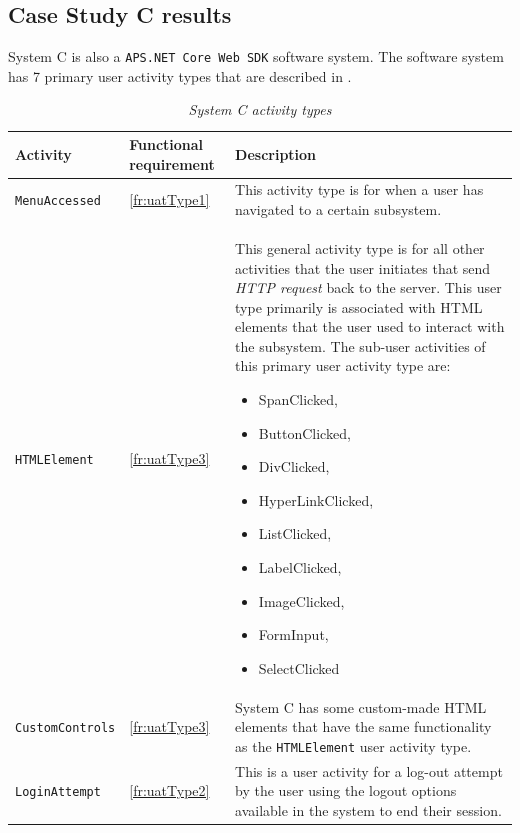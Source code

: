 \clearpage

\subsection{Case Study C results}\label{sec:ch3_csC}
System C is also a \texttt{APS.NET Core Web SDK} software system. The software system has 7 primary user activity types that are described in .

\begin{table}[!htb]
	\centering
	\caption[System A activity types]{\textit{System C activity types}}
	\label{tbl:ch3_systemCActivityTypes}
	\begin{tabularx}{\textwidth}{|l|l|X|}
		\hline \textbf{Activity} & \textbf{Functional requirement} & \textbf{Description} \\
		\hline \texttt{MenuAccessed} & \ref{fr:uatType1} & \RaggedRight This activity type is for when a user has navigated to a certain subsystem. \\ 
		\hline \texttt{HTMLElement} & \ref{fr:uatType3} & \RaggedRight This general activity type is for all other activities that the user initiates that send \textit{HTTP request} back to the server. This user type primarily is associated with HTML elements that the user used to interact with the subsystem. The sub-user activities of this primary user activity type are: \begin{itemize}
			\item SpanClicked,
			\item ButtonClicked, 
			\item DivClicked, 
			\item HyperLinkClicked,
			\item ListClicked, 
			\item LabelClicked, 
			\item ImageClicked, 
			\item FormInput, 
			\item SelectClicked
		\end{itemize} \\
		\hline \texttt{CustomControls} & \ref{fr:uatType3} & \RaggedRight System C has some custom-made HTML elements that have the same functionality as the \texttt{HTMLElement} user activity type. \\ 
		\hline \texttt{LoginAttempt} & \ref{fr:uatType2} & \RaggedRight This is a user activity for a log-out attempt by the user using the logout options available in the system to end their session. \\ 

\end{tabularx}
\end{table}
